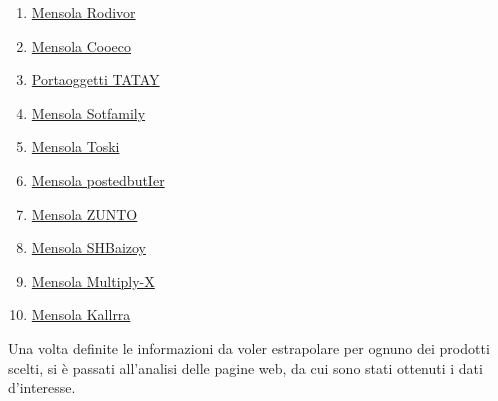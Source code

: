 \begin{enumerate}
\setlength\itemsep{0.1em}
    \item \href{https://www.amazon.it/Antiruggine-Portasapone-Lavandino-Portaoggetti-18mm-27mm/dp/B09CP8FHT2/ref=zg_bs_731832031_sccl_1/259-1215578-3223537?psc=1}{Mensola Rodivor}
    \item \href{https://www.amazon.it/Cooeco-Mensola-Doccia-Appendere-Portaoggetti/dp/B09XMJV235/ref=zg_bs_731832031_sccl_2/259-1215578-3223537?psc=1}{Mensola Cooeco}
    \item \href{https://www.amazon.it/Portaoggetti-Plastica-Polipropilene-Multifunzionale-Dimensioni/dp/B09YHK839K/ref=zg_bs_731832031_sccl_4/259-1215578-3223537?th=1}{Portaoggetti TATAY}\label{it:prod3}
    \item \href{https://www.amazon.it/pezzi-Mensola-Angolare-Doccia-Mensole/dp/B097D5CXQQ/ref=zg_bs_731832031_sccl_6/259-1215578-3223537?th=1}{Mensola Sotfamily}
    \item \href{https://www.amazon.it/Toski-acrilico-Dellacquazzone-Dellorganizzatore-Foratura/dp/B0B2RDBLNT/ref=zg_bs_731832031_sccl_12/259-1215578-3223537?psc=1}{Mensola Toski}
    \item \href{https://www.amazon.it/Doccia-Mensole-Portaoggetti-BagnoOrganizzatore-Autoadesivo-Scaffale/dp/B098M691YV/ref=zg_bs_731832031_sccl_20/259-1215578-3223537?psc=1}{Mensola postedbutIer}
    \item \href{https://www.amazon.it/ZUNTO-Mensola-Doccia-Autoadesivo-Mensole-Bagno-Organizzatore/dp/B07YDD1HX5/ref=zg_bs_731832031_sccl_2/259-1215578-3223537?psc=1}{Mensola ZUNTO}
    \item \href{https://www.amazon.it/SHBaizoy-perforazione-Ajustable-telescopico-Portasapone/dp/B0B6C98DB8/ref=zg_bs_731832031_sccl_3/259-1215578-3223537?psc=1}{Mensola SHBaizoy}
    \item \href{https://www.amazon.it/Multiply-X-portaoggetti-Anti-ruggine-anodizzato-detergente/dp/B06XHTMPR1/ref=zg_bs_731832031_sccl_44/259-1215578-3223537?psc=1}{Mensola Multiply-X}
    \item \href{https://www.amazon.it/Kallrra-Mensola-Angolare-Acciaio-Portasapone/dp/B09FP98NWM/ref=zg_bs_731832031_sccl_50/259-1215578-3223537?th=1}{Mensola Kallrra}
\end{enumerate}

Una volta definite le informazioni da voler estrapolare per ognuno dei prodotti scelti, si è passati all'analisi delle pagine web, da cui sono stati ottenuti i dati d'interesse.

